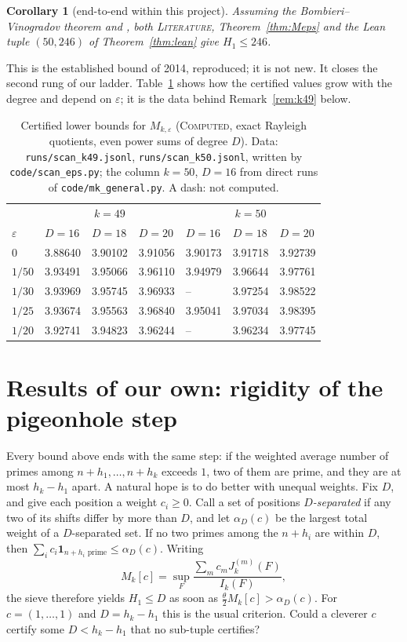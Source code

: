 \documentclass[11pt]{amsart}
\newtheorem{corollary}[theorem]{Corollary}
\theoremstyle{definition}
\theoremstyle{remark}
\newcommand{\lbl}[1]{\textup{\textsc{#1}}}
\begin{document}
\begin{corollary}[end-to-end within this project]\label{cor:246}
Assuming the Bombieri--Vinogradov theorem and \cite[Thm.~3.12(i)]{Pol14b},
both \lbl{Literature}, Theorem~\ref{thm:Meps} and the Lean tuple $(50,246)$
of Theorem~\ref{thm:lean} give $H_1\le246$.
\end{corollary}

This is the established bound of 2014, reproduced; it is not new. It closes
the second rung of our ladder. Table~\ref{tab:eps} shows how the certified
values grow with the degree and depend on $\varepsilon$; it is the data
behind Remark~\ref{rem:k49} below.

\begin{table}[h]
\caption{Certified lower bounds for $M_{k,\varepsilon}$ (\lbl{Computed}, exact
Rayleigh quotients, even power sums of degree $D$). Data:
\texttt{runs/scan\_k49.jsonl}, \texttt{runs/scan\_k50.jsonl}, written by
\texttt{code/scan\_eps.py}; the column $k=50$, $D=16$ from direct runs of
\texttt{code/mk\_general.py}. A dash: not computed.}
\label{tab:eps}
\begin{tabular}{@{}lllllll@{}}
\toprule
& \multicolumn{3}{c}{$k=49$} & \multicolumn{3}{c}{$k=50$}\\
$\varepsilon$ & $D=16$ & $D=18$ & $D=20$ & $D=16$ & $D=18$ & $D=20$\\
\midrule
$0$    & 3.88640 & 3.90102 & 3.91056 & 3.90173 & 3.91718 & 3.92739\\
$1/50$ & 3.93491 & 3.95066 & 3.96110 & 3.94979 & 3.96644 & 3.97761\\
$1/30$ & 3.93969 & 3.95745 & 3.96933 & --      & 3.97254 & 3.98522\\
$1/25$ & 3.93674 & 3.95563 & 3.96840 & 3.95041 & 3.97034 & 3.98395\\
$1/20$ & 3.92741 & 3.94823 & 3.96244 & --      & 3.96234 & 3.97745\\
\bottomrule
\end{tabular}
\end{table}

\section{Results of our own: rigidity of the pigeonhole step}

Every bound above ends with the same step: if the weighted average number of
primes among $n+h_1,\dots,n+h_k$ exceeds $1$, two of them are prime, and they
are at most $h_k-h_1$ apart. A natural hope is to do better with unequal
weights. Fix $D$, and give each position a weight $c_i\ge0$. Call a set of
positions \emph{$D$-separated} if any two of its shifts differ by more than
$D$, and let $\alpha_D(c)$ be the largest total weight of a $D$-separated set.
If no two primes among the $n+h_i$ are within $D$, then
$\sum_ic_i\mathbf 1_{n+h_i\text{ prime}}\le\alpha_D(c)$. Writing
\[
M_k[c]=\sup_F\frac{\sum_{m}c_mJ_k^{(m)}(F)}{I_k(F)},
\]
the sieve therefore yields $H_1\le D$ as soon as
$\tfrac{\theta}{2}M_k[c]>\alpha_D(c)$. For $c=(1,\dots,1)$ and $D=h_k-h_1$
this is the usual criterion. Could a cleverer $c$ certify some $D<h_k-h_1$
that no sub-tuple certifies?
\end{document}
